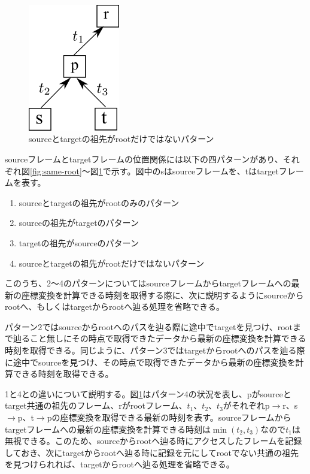 \documentclass[a4paper]{jreport}	%
\begin{document}
\begin{figure}[h] 
\centering
\includegraphics[width=4cm]{same-parent}
\caption{sourceとtargetの祖先がrootだけではないパターン}
\label{fig:same-parent}
\end{figure}

sourceフレームとtargetフレームの位置関係には以下の四パターンがあり、それぞれ図\ref{fig:same-root}〜図\ref{fig:same-parent}で示す。図中のsはsourceフレームを、tはtargetフレームを表す。

\begin{enumerate}
	\item sourceとtargetの祖先がrootのみのパターン
	\item sourceの祖先がtargetのパターン
	\item targetの祖先がsourceのパターン
	\item sourceとtargetの祖先がrootだけではないパターン
\end{enumerate}

このうち、2〜4のパターンについてはsourceフレームからtargetフレームへの最新の座標変換を計算できる時刻を取得する際に、次に説明するようにsourceからrootへ、もしくはtargetからrootへ辿る処理を省略できる。

パターン2ではsourceからrootへのパスを辿る際に途中でtargetを見つけ、rootまで辿ること無しにその時点で取得できたデータから最新の座標変換を計算できる時刻を取得できる。同じように、パターン3ではtargetからrootへのパスを辿る際に途中でsourceを見つけ、その時点で取得できたデータから最新の座標変換を計算できる時刻を取得できる。

1と4との違いについて説明する。図\ref{fig:same-parent}はパターン4の状況を表し、pがsourceとtarget共通の祖先のフレーム、rがrootフレーム、$t_1$、$t_2$、$t_3$がそれぞれp$\rightarrow$r、s$\rightarrow$p、t$\rightarrow$pの座標変換を取得できる最新の時刻を表す。sourceフレームからtargetフレームへの最新の座標変換を計算できる時刻は$\min(t_2, t_3)$なので$t_1$は無視できる。このため、sourceからrootへ辿る時にアクセスしたフレームを記録しておき、次にtargetからrootへ辿る時に記録を元にしてrootでない共通の祖先を見つけられれば、targetからrootへ辿る処理を省略できる。
\end{document}
